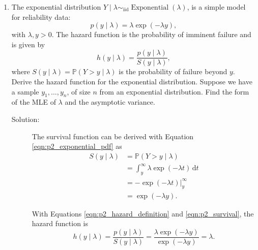 \documentclass[letterpaper,11pt]{article}
\begin{document}
\begin{enumerate}
  \begin{enumerate}
  \item The exponential distribution
    $Y \mid \lambda \sim_\mathrm{iid} \operatorname{Exponential}(\lambda)$, is a
    simple model for reliability data:
    \begin{equation}
      p\left(y \mid \lambda \right) =
      \lambda \exp\left(-\lambda y\right),
      \label{eqn:p2_exponential_pdf}
    \end{equation}
    with $\lambda, y > 0$. The hazard function is the probability of imminent
    failure and is given by
    \begin{equation}
      h\left(y\mid\lambda\right) =
      \frac{p\left(y \mid \lambda\right)}{S\left(y\mid\lambda\right)},
      \label{eqn:p2_hazard_definition}
    \end{equation}
    where
    $S\left(y\mid\lambda\right) = \mathbb{P}\left(Y > y \mid \lambda\right)$ is
    the probability of failure beyond $y$. Derive the hazard function for the
    exponential distribution. Suppose we have a sample $y_1,\ldots,y_n$, of size
    $n$ from an exponential distribution. Find the form of the MLE of $\lambda$
    and the asymptotic variance.
      \begin{description}
      \item[Solution:] The survival function can be derived with Equation
        \ref{eqn:p2_exponential_pdf} as
        \begin{align}
          S\left(y\mid\lambda\right)
          &= \mathbb{P}\left(Y > y \mid \lambda\right) \nonumber\\
          &= \int_y^\infty \lambda \exp\left(-\lambda t\right)\,\mathrm{d}t \nonumber\\
          &= \left. -\exp\left(-\lambda t\right) \right|^\infty_y \nonumber \\
          &= \exp\left(-\lambda y\right).
            \label{eqn:p2_survival}
        \end{align}

        With Equations \ref{eqn:p2_hazard_definition} and \ref{eqn:p2_survival},
        the hazard function is
        \begin{equation}
          h\left(y\mid\lambda\right) =
          \frac{p\left(y \mid \lambda\right)}{S\left(y\mid\lambda\right)}
          = \frac{\lambda \exp\left(-\lambda y\right)}{\exp\left(-\lambda y\right)} = \lambda.
          \label{eqn:p2_hazard}
        \end{equation}
      \end{description}


\end{enumerate}
\end{enumerate}
\end{document}
